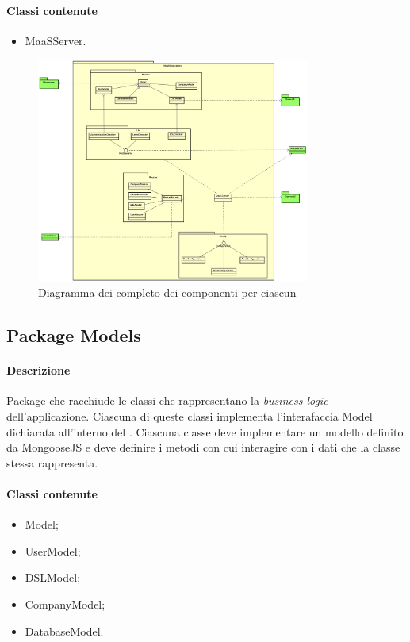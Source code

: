 \paragraph*{Classi contenute}
\begin{itemize}
\item MaaSServer.
\end{itemize}

\begin{figure}[H]
\centering
\includegraphics[width=0.8\textwidth]{res/sections/backend/collegamenti.png}
\caption{Diagramma dei  completo dei componenti per ciascun }
\end{figure}

\subsection{Package Models}
\paragraph*{Descrizione}
Package che racchiude le classi che rappresentano la \textit{business logic} dell'applicazione. Ciascuna di queste classi implementa l'interafaccia Model dichiarata all'interno del .
Ciascuna classe deve implementare un modello definito da MongooseJS e deve definire i metodi con cui interagire con i dati che la classe stessa rappresenta. \\

\paragraph*{Classi contenute}
\begin{itemize}
\item Model;
\item UserModel;
\item DSLModel;
\item CompanyModel;
\item DatabaseModel.
\end{itemize}

